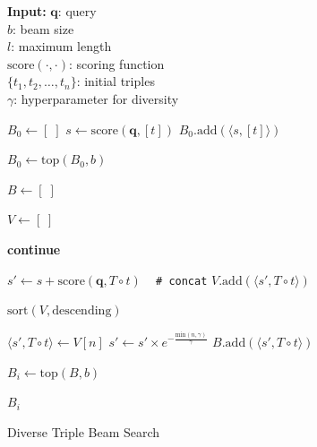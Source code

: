 \begin{algorithm}[ht]
\textbf{Input:} $\mathbf{q}$: query \\
\hspace*{3em} $b$: beam size \\
\hspace*{3em} $l$: maximum length \\
\hspace*{3em} $\mathrm{score}(\cdot, \cdot)$: scoring function \\
\hspace*{3em} $\{t_1, t_2, \ldots, t_n\}$: initial triples \\
\hspace*{3em} $\gamma$: hyperparameter for diversity


\begin{algorithmic}[1]
\State $B_0 \gets [\;]$
    \State $s \gets \mathrm{score}(\mathbf{q}, [t])$
    \State $B_0.\mathrm{add}(\langle s, [t] \rangle)$
\EndFor

\State $B_0 \gets \mathrm{top}(B_0, b)$


    \State $B \gets [\;]$
    
        \State $V \gets [\;]$

                \State \textbf{continue}
            \EndIf
            
            \State $s' \gets s + \mathrm{score}(\mathbf{q}, T \circ t)$ ~ \texttt{\# concat} 
            \State $V.\mathrm{add}(\langle s', T \circ t \rangle)$
        \EndFor

        \State $\mathrm{sort}(V, \mathrm{descending})$

            \State $\langle s', T \circ t \rangle \gets V[n]$
            \State $s' \gets s' \times e^{- \frac{\mathrm{min}(n, \gamma)}{\gamma}}$
            \State $B.\mathrm{add}(\langle s', T \circ t \rangle)$
        \EndFor
        
    \EndFor
    \State $B_i \gets \mathrm{top}(B, b)$
    
\EndFor

\State \Return $B_i$
\end{algorithmic}

\caption{Diverse Triple Beam Search}
\label{alg:beam_search}
\end{algorithm}

